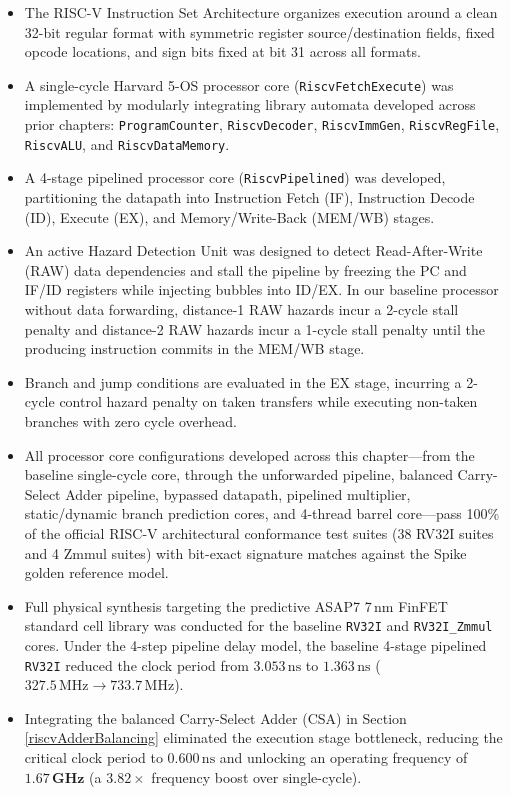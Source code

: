\begin{itemize}
    \item The RISC-V Instruction Set Architecture organizes execution around a clean 32-bit regular format with symmetric register source/destination fields, fixed opcode locations, and sign bits fixed at bit 31 across all formats.
    \item A single-cycle Harvard 5-OS processor core (\texttt{RiscvFetchExecute}) was implemented by modularly integrating library automata developed across prior chapters: \texttt{ProgramCounter}, \texttt{RiscvDecoder}, \texttt{RiscvImmGen}, \texttt{RiscvRegFile}, \texttt{RiscvALU}, and \texttt{RiscvDataMemory}.
    \item A 4-stage pipelined processor core (\texttt{RiscvPipelined}) was developed, partitioning the datapath into Instruction Fetch (IF), Instruction Decode (ID), Execute (EX), and Memory/Write-Back (MEM/WB) stages.
    \item An active Hazard Detection Unit was designed to detect Read-After-Write (RAW) data dependencies and stall the pipeline by freezing the PC and IF/ID registers while injecting bubbles into ID/EX. In our baseline processor without data forwarding, distance-1 RAW hazards incur a 2-cycle stall penalty and distance-2 RAW hazards incur a 1-cycle stall penalty until the producing instruction commits in the MEM/WB stage.
    \item Branch and jump conditions are evaluated in the EX stage, incurring a 2-cycle control hazard penalty on taken transfers while executing non-taken branches with zero cycle overhead.
    \item All processor core configurations developed across this chapter---from the baseline single-cycle core, through the unforwarded pipeline, balanced Carry-Select Adder pipeline, bypassed datapath, pipelined multiplier, static/dynamic branch prediction cores, and 4-thread barrel core---pass 100\% of the official RISC-V architectural conformance test suites (38 RV32I suites and 4 Zmmul suites) with bit-exact signature matches against the Spike golden reference model.
    \item Full physical synthesis targeting the predictive ASAP7 7\,nm FinFET standard cell library was conducted for the baseline \texttt{RV32I} and \texttt{RV32I\_Zmmul} cores. Under the 4-step pipeline delay model, the baseline 4-stage pipelined \texttt{RV32I} reduced the clock period from $3.053\,\text{ns}$ to $1.363\,\text{ns}$ ($327.5\,\text{MHz} \to 733.7\,\text{MHz}$).
    \item Integrating the balanced Carry-Select Adder (CSA) in Section \ref{riscvAdderBalancing} eliminated the execution stage bottleneck, reducing the critical clock period to $0.600\,\text{ns}$ and unlocking an operating frequency of $\mathbf{1.67\,\text{GHz}}$ (a $3.82\times$ frequency boost over single-cycle).

\end{itemize}
